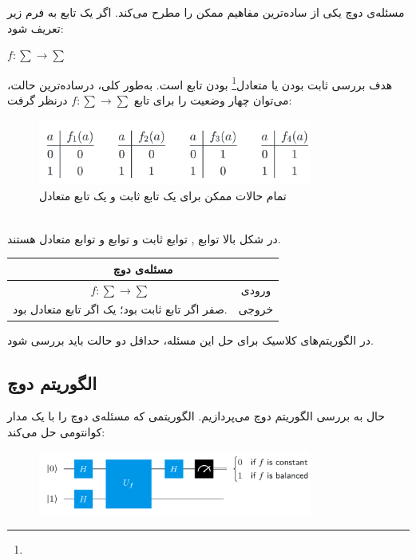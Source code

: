 \documentclass{book}
\begin{document}
مسئله‌ی دوچ یکی از ساده‌ترین مفاهیم ممکن را مطرح می‌کند. اگر یک تابع به فرم زیر تعریف شود: 
\begin{center}
	$f : \sum \rightarrow \sum$
\end{center}
هدف بررسی ثابت بودن یا متعادل\footnote{} بودن تابع  است. 
به‌طور کلی، درساده‌ترین حالت، می‌توان چهار وضعیت را برای تابع $f : \sum \rightarrow \sum$ درنظر گرفت:\\
\begin{figure}[ht]
	\centering
	\includegraphics[width=0.8\textwidth]{Constantorbalanse.png}
	\caption{تمام حالات ممکن برای یک تابع ثابت و یک تابع متعادل}
\end{figure}\\
در شکل بالا توابع  ,  توابع ثابت و توابع  و  توابع متعادل هستند.
\begin{center}
\begin{tabular}{|c|c|}
	\hline
	\multicolumn{2}{|c|}{مسئله‌ی دوچ} \\
	\hline
	$f : \sum \rightarrow \sum$ & ورودی \\
	\hline
	صفر اگر تابع ثابت بود؛ یک اگر تابع متعادل بود.  & خروجی \\
	\hline
\end{tabular}
\end{center}
در الگوریتم‌های کلاسیک برای حل این مسئله، حداقل دو حالت باید بررسی شود.
\subsection{الگوریتم دوچ}

حال به بررسی الگوریتم دوچ می‌پردازیم. الگوریتمی که مسئله‌ی دوچ را با یک مدار کوانتومی حل می‌کند:\\
\begin{center}
\begin{figure}[ht]
	\centering
	\includegraphics[width=0.8\textwidth]{Deutsch algorithm.png}
	\caption{}
\end{figure}
\end{center}
\end{document}
